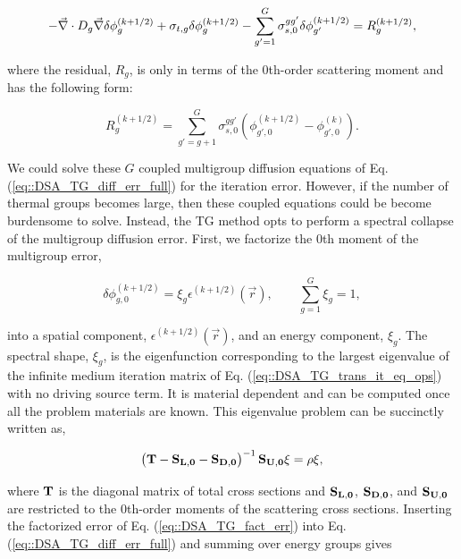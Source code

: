 \begin{equation}
\label{eq::DSA_TG_diff_err_full}
-\vec{\nabla} \cdot D_g \vec{\nabla} \delta \phi_{g}^{(k+1/2)} + \sigma_{t,g} \delta \phi_{g}^{(k+1/2)} - \sum\displaylimits_{g'=1}^{G} \sigma_{s,0}^{g g'} \delta \phi_{g'}^{(k+1/2)} = R_g^{(k+1/2)} ,
\end{equation}

\noindent where the residual, $R_g$, is only in terms of the 0th-order scattering moment and has the following form:

\begin{equation}
\label{eq::DSA_TG_diff_residual}
R_g^{(k+1/2)} = \sum_{g'=g+1}^G \sigma_{s,0}^{g g'} \left( \phi_{g',0}^{(k+1/2)} - \phi_{g',0}^{(k)} \right) .
\end{equation}

\noindent We could solve these $G$ coupled multigroup diffusion equations of Eq. (\ref{eq::DSA_TG_diff_err_full}) for the iteration error. However, if the number of thermal groups becomes large, then these coupled equations could be become burdensome to solve. Instead, the TG method opts to perform a spectral collapse of the multigroup diffusion error. First, we factorize the 0th moment of the multigroup error,

\begin{equation}
\label{eq::DSA_TG_fact_err}
\delta \phi_{g,0}^{(k+1/2)} = \xi_g \epsilon^{(k+1/2)} (\vec{r}), \qquad \sum_{g=1}^G \xi_g = 1,
\end{equation}

\noindent into a spatial component, $\epsilon^{(k+1/2)} (\vec{r})$, and an energy component, $\xi_g$. The spectral shape, $\xi_g$, is the eigenfunction corresponding to the largest eigenvalue of the infinite medium iteration matrix of Eq. (\ref{eq::DSA_TG_trans_it_eq_ops}) with no driving source term. It is material dependent and can be computed once all the problem materials are known. This eigenvalue problem can be succinctly written as,

\begin{equation}
\label{eq::DSA_TG_eigenpprob}
\left(  {\bf T} - {\bf S_{L,0}} - {\bf S_{D,0}} \right)^{-1} {\bf S_{U,0}} \xi = \rho \xi ,
\end{equation}

\noindent where ${\bf T}$ is the diagonal matrix of total cross sections and ${\bf S_{L,0}}$, ${\bf S_{D,0}}$, and ${\bf S_{U,0}}$ are restricted to the 0th-order moments of the scattering cross sections. Inserting the factorized error of Eq. (\ref{eq::DSA_TG_fact_err}) into Eq. (\ref{eq::DSA_TG_diff_err_full}) and summing over energy groups gives

